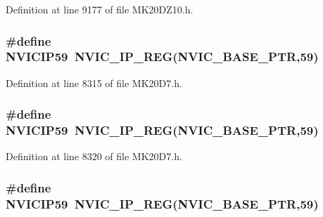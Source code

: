Definition at line 9177 of file M\+K20\+D\+Z10.\+h.

\subsubsection[{\texorpdfstring{N\+V\+I\+C\+I\+P59}{NVICIP59}}]{\setlength{\rightskip}{0pt plus 5cm}\#define N\+V\+I\+C\+I\+P59~{\bf N\+V\+I\+C\+\_\+\+I\+P\+\_\+\+R\+EG}({\bf N\+V\+I\+C\+\_\+\+B\+A\+S\+E\+\_\+\+P\+TR},59)}\hypertarget{group___n_v_i_c___register___accessor___macros_gab9b893e230a8fe07a89c27025810305c}{}\label{group___n_v_i_c___register___accessor___macros_gab9b893e230a8fe07a89c27025810305c}


Definition at line 8315 of file M\+K20\+D7.\+h.

\subsubsection[{\texorpdfstring{N\+V\+I\+C\+I\+P59}{NVICIP59}}]{\setlength{\rightskip}{0pt plus 5cm}\#define N\+V\+I\+C\+I\+P59~{\bf N\+V\+I\+C\+\_\+\+I\+P\+\_\+\+R\+EG}({\bf N\+V\+I\+C\+\_\+\+B\+A\+S\+E\+\_\+\+P\+TR},59)}\hypertarget{group___n_v_i_c___register___accessor___macros_gab9b893e230a8fe07a89c27025810305c}{}\label{group___n_v_i_c___register___accessor___macros_gab9b893e230a8fe07a89c27025810305c}


Definition at line 8320 of file M\+K20\+D7.\+h.

\subsubsection[{\texorpdfstring{N\+V\+I\+C\+I\+P59}{NVICIP59}}]{\setlength{\rightskip}{0pt plus 5cm}\#define N\+V\+I\+C\+I\+P59~{\bf N\+V\+I\+C\+\_\+\+I\+P\+\_\+\+R\+EG}({\bf N\+V\+I\+C\+\_\+\+B\+A\+S\+E\+\_\+\+P\+TR},59)}\hypertarget{group___n_v_i_c___register___accessor___macros_gab9b893e230a8fe07a89c27025810305c}{}\label{group___n_v_i_c___register___accessor___macros_gab9b893e230a8fe07a89c27025810305c}


